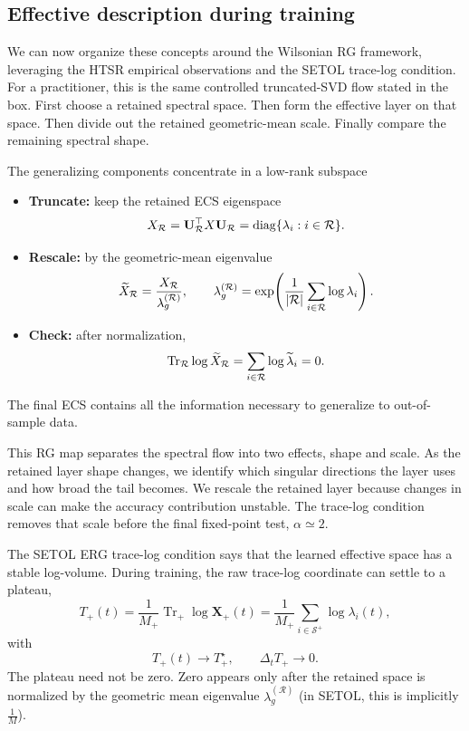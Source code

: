 \documentclass[10pt,twocolumn]{article}
\newcommand{\Tr}{\operatorname{Tr}}
\newcommand{\X}{\mathbf X}
\newcommand{\U}{\mathbf U}
\newcommand{\Rell}{\mathcal R}
\newcommand{\Splus}{\mathcal S^+}
\newcommand{\takeaway}[1]{%
  \par\vspace{4pt}\noindent\textcolor{boxblue}{#1}%
}
\newcommand{\eqtight}[1]{\[\vspace{-1pt}#1\vspace{-3pt}\]}
\begin{document}
\clearpage

\subsection{Effective description during training}
\label{sxn:effdescr}
We can now organize these concepts around the Wilsonian RG framework, leveraging the HTSR empirical observations and the  SETOL trace-log condition.
For a practitioner, this is the same controlled truncated-SVD flow stated in the box. First choose a retained spectral space.
Then form the effective layer on that space. Then divide out the retained geometric-mean scale. Finally compare the remaining spectral shape.

\begin{tcolorbox}[marginalbox,title=\textbf{10. RG step as ECS/SVD projection}]
The generalizing components concentrate in a low-rank subspace
  \begin{itemize}
\item \textbf{Truncate:} keep the retained ECS eigenspace
\eqtight{
X_{\Rell}=\U_{\Rell}^\top X \U_{\Rell}
      =\operatorname{diag}\{\lambda_i:i\in\mathcal R\}.
}
\item \textbf{Rescale:} by the geometric-mean eigenvalue
\eqtight{
\widetilde X_{\Rell}=\frac{X_{\Rell}}{\lambda_g^{(\mathcal R)}},
\qquad
\lambda_g^{(\mathcal R)}
=
\exp\!\left(
\frac{1}{|\mathcal R|}
\sum_{i\in\mathcal R}\log\lambda_i
\right).
}
\item \textbf{Check:} after normalization,
\eqtight{
\Tr_{\mathcal R}\log\widetilde X_{\Rell}
=
\sum_{i\in\mathcal R}\log\widetilde\lambda_i
=
0.
}
\end{itemize}
  \takeaway{The final ECS contains all the information necessary to generalize to out-of-sample data.}
\end{tcolorbox}


This RG map separates the spectral flow into two effects, shape and scale.
As the retained layer shape changes, we identify which singular directions the layer uses and how broad the tail becomes.
We rescale the retained layer because changes in scale can make the accuracy contribution unstable.
The trace-log condition removes that scale before the final fixed-point test, $\alpha\simeq 2$. 

The SETOL ERG trace-log condition says that the learned effective space has a stable log-volume.
During training, the raw trace-log coordinate can settle to a plateau,
\begin{equation}
T_+(t)=\frac{1}{M_+}\Tr_{+}\log\X_+(t)
=\frac{1}{M_+}\sum_{i\in\Splus}\log\lambda_i(t),
\label{eq:setol_raw_plateau_T}
\end{equation}
with
\begin{equation}
T_+(t)\to T_+^\star,
\qquad
\Delta_t T_+\to0 .
\label{eq:setol_raw_plateau}
\end{equation}
The plateau need not be zero. Zero appears only after the retained space is normalized by the geometric mean eigenvalue $\lambda_g^{(\mathcal R)}$
(in SETOL, this is implicitly $\tfrac{1}{M}$).
\end{document}
